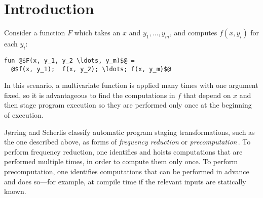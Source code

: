 
\section{Introduction}
\label{sec:intro}


Consider a function $F$ which takes an $x$ and $y_1,\dots,y_m$, and computes
$f(x,y_i)$ for each $y_i$:
\begin{lstlisting}
fun @$F(x, y_1, y_2 \ldots, y_m)$@ = 
  @$f(x, y_1);  f(x, y_2); \ldots; f(x, y_m)$@
\end{lstlisting}
%
In this scenario, a multivariate function is applied many times with
one argument fixed, so it is advantageous to find the computations in
$f$ that depend on $x$ and then stage program execution so they are
performed only once at the beginning of execution.



J{\o}rring and Scherlis classify automatic program staging
transformations, such as the one described above, as forms of {\em
  frequency reduction} or {\em
  precomputation}\,\cite{JS86-staging}. To perform frequency
reduction, one identifies and hoists computations that are performed
multiple times, in order to compute them only once. To perform
precomputation, one identifies computations that can be performed in
advance and does so---for example, at compile time if the relevant
inputs are statically known.

